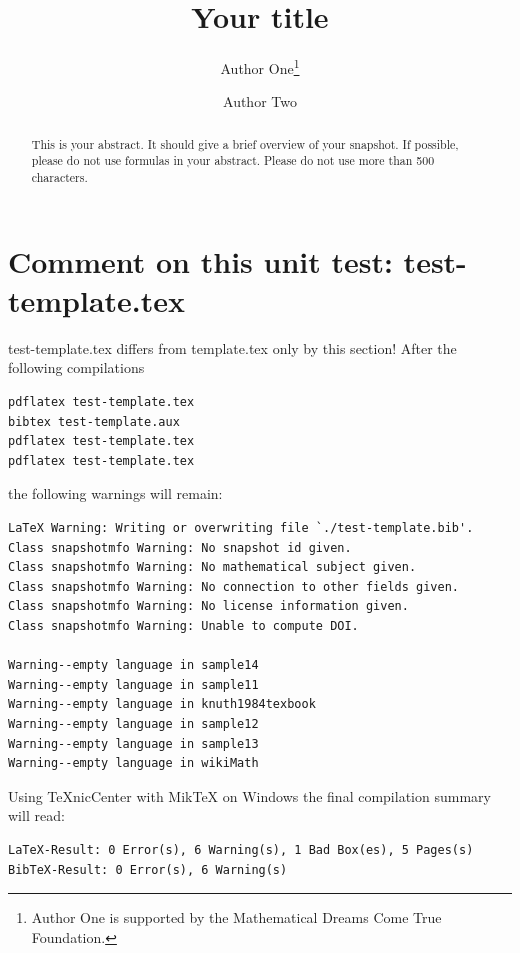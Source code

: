 \documentclass{snapshotmfo}
\author{Author One\thanks{Author One is supported by the Mathematical Dreams Come True Foundation.} \and Author Two}
\title{Your title}
\begin{document}
\begin{abstract}
This is your abstract. It should give a brief overview of your snapshot. If possible, please do not use formulas in your abstract. Please do not use more than 500 characters. 
\end{abstract}

\section{Comment on this unit test: test-template.tex}
test-template.tex differs from template.tex only by this section!
After the following compilations
\begin{verbatim}
pdflatex test-template.tex
bibtex test-template.aux
pdflatex test-template.tex
pdflatex test-template.tex
\end{verbatim}
the following warnings will remain:
\begin{verbatim}
LaTeX Warning: Writing or overwriting file `./test-template.bib'.
Class snapshotmfo Warning: No snapshot id given.
Class snapshotmfo Warning: No mathematical subject given.
Class snapshotmfo Warning: No connection to other fields given.
Class snapshotmfo Warning: No license information given.
Class snapshotmfo Warning: Unable to compute DOI.

Warning--empty language in sample14
Warning--empty language in sample11
Warning--empty language in knuth1984texbook
Warning--empty language in sample12
Warning--empty language in sample13
Warning--empty language in wikiMath
\end{verbatim}

Using TeXnicCenter with MikTeX on Windows the final compilation summary will read:
\begin{verbatim}
LaTeX-Result: 0 Error(s), 6 Warning(s), 1 Bad Box(es), 5 Pages(s)
BibTeX-Result: 0 Error(s), 6 Warning(s)
\end{verbatim}
\end{document}
